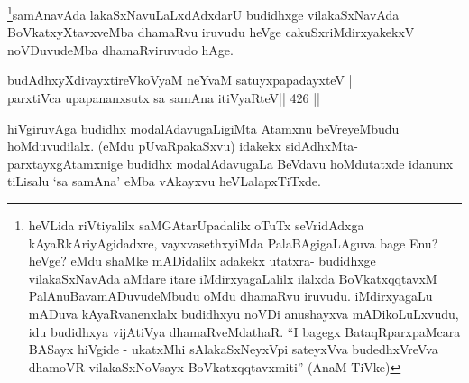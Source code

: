\begin{artha}
\footnote{heVLida riVtiyalilx saMGAtarUpadalilx oTuTx seVridAdxga kAyaRkAriyAgidadxre, vayxvasethxyiMda PalaBAgigaLAguva bage Enu? heVge? eMdu shaMke mADidalilx adakekx utatxra- budidhxge vilakaSxNavAda aMdare itare iMdirxyagaLalilx  ilalxda BoVkatxqqtavxM PalAnuBavamADuvudeMbudu oMdu dhamaRvu iruvudu. iMdirxyagaLu mADuva kAyaRvanenxlalx budidhxyu noVDi anushayxva mADikoLuLxvudu, idu budidhxya vijAtiVya dhamaRveMdathaR. ``I bagegx BataqRparxpaMcara BASayx hiVgide - ukatxMhi sAlakaSxNeyxVpi sateyxVva budedhxVreVva dhamoVR vilakaSxNoV\s sayx BoVkatxqqtavxmiti'' (AnaM-TiVke)}samAnavAda lakaSxNavuLaLxdAdxdarU budidhxge vilakaSxNavAda BoVkatxyXtavxveMba dhamaRvu iruvudu heVge cakuSxriMdirxyakekxV noVDuvudeMba dhamaRviruvudo hAge.
\end{artha}

\begin{shl}
budAdhxyXdivayxtireVkoV\s yaM neYvaM satuyxpapadayxteV | \\
parxtiVca upapananxsutx sa samAna itiVyaRteV\hfill ||  426 ||  
\end{shl}

\begin{artha}
hiVgiruvAga  budidhx modalAdavugaLigiMta Atamxnu beVreyeMbudu hoMduvudilalx. (eMdu pUvaRpakaSxvu) idakekx sidAdhxMta-  parxtayxgAtamxnige budidhx modalAdavugaLa BeVdavu hoMdutatxde idanunx tiLisalu `sa samAna' eMba vAkayxvu heVLalapxTiTxde.
\end{artha}


